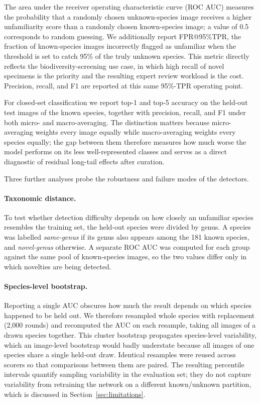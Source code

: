 \documentclass[11pt]{article}
\begin{document}
The area under the receiver operating characteristic curve (ROC AUC) measures the probability that a randomly chosen unknown-species image receives a higher unfamiliarity score than a randomly chosen known-species image; a value of 0.5 corresponds to random guessing. We additionally report FPR@95\%TPR, the fraction of known-species images incorrectly flagged as unfamiliar when the threshold is set to catch 95\% of the truly unknown species. This metric directly reflects the biodiversity-screening use case, in which high recall of novel specimens is the priority and the resulting expert review workload is the cost. Precision, recall, and F1 are reported at this same 95\%-TPR operating point.

For closed-set classification we report top-1 and top-5 accuracy on the held-out test images of the known species, together with precision, recall, and F1 under both micro- and macro-averaging. The distinction matters because micro-averaging weights every image equally while macro-averaging weights every species equally; the gap between them therefore measures how much worse the model performs on its less well-represented classes and serves as a direct diagnostic of residual long-tail effects after curation.

Three further analyses probe the robustness and failure modes of the detectors.

\paragraph{Taxonomic distance.} To test whether detection difficulty depends on how closely an unfamiliar species resembles the training set, the held-out species were divided by genus. A species was labelled \emph{same-genus} if its genus also appears among the 181 known species, and \emph{novel-genus} otherwise. A separate ROC AUC was computed for each group against the same pool of known-species images, so the two values differ only in which novelties are being detected.

\paragraph{Species-level bootstrap.} Reporting a single AUC obscures how much the result depends on which species happened to be held out. We therefore resampled whole species with replacement (2,000 rounds) and recomputed the AUC on each resample, taking all images of a drawn species together. This cluster bootstrap propagates species-level variability, which an image-level bootstrap would badly understate because all images of one species share a single held-out draw. Identical resamples were reused across scorers so that comparisons between them are paired. The resulting percentile intervals quantify sampling variability in the evaluation set; they do not capture variability from retraining the network on a different known/unknown partition, which is discussed in Section~\ref{sec:limitations}.
\end{document}
